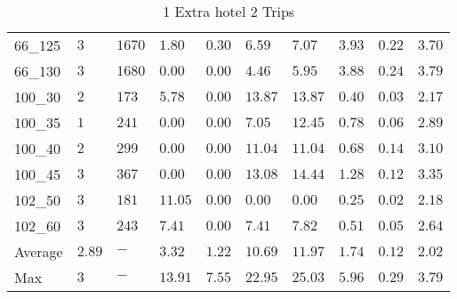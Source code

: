 \begin{center}
\begin{table}[]
\begin{adjustwidth}{-0.4in}{-1in}
\begin{tabular}{|lll|l|l|ll|lll|}
66\_125  & $3$    & $1670$ & $1.80 $  & $0.30$     & $6.59 $      & $7.07 $     & $3.93$   & $0.22$     & $3.70$      \\
66\_130  & $3$    & $1680$ & $\bm{0.00} $  & $\bm{0.00}$     & $4.46 $      & $5.95 $     & $3.88$   & $0.24$     & $3.79$      \\
\hline
100\_30  & $2$    & $173$  & $5.78$   & $\bm{0.00}$     & $13.87$      & $13.87$     & $0.40$   & $0.03$     & $2.17$      \\
100\_35  & $1$    & $241$  & $\bm{0.00}$   & $\bm{0.00}$     & $7.05 $      & $12.45$     & $0.78$   & $0.06$     & $2.89$      \\
100\_40  & $2$    & $299$  & $\bm{0.00}$   & $\bm{0.00}$     & $11.04$      & $11.04$     & $0.68$   & $0.14$     & $3.10$      \\
100\_45  & $3$    & $367$  & $\bm{0.00}$   & $\bm{0.00}$     & $13.08$      & $14.44$     & $1.28$   & $0.12$     & $3.35$      \\
\hline
102\_50  & $3$    & $181$  & $11.05$  & $\bm{0.00}$     & $\bm{0.00}$       & $\bm{0.00}$      & $0.25$   & $0.02$     & $2.18$      \\
102\_60  & $3$    & $243$  & $7.41 $  & $\bm{0.00}$     & $7.41$       & $7.82$      & $0.51$   & $0.05$     & $2.64$      \\
\hline
Average & $2.89$  & $-$    & $3.32 $  & $1.22$     & $10.69$      & $11.97$     & $1.74$   & $0.12$     & $2.02$      \\
Max     & $3   $  & $-$    & $13.91$  & $7.55$     & $22.95$      & $25.03$     & $5.96$   & $0.29$     & $3.79$      \\
\hline
    \end{tabular}
    \end{adjustwidth}
    \caption{1 Extra hotel 2 Trips}
    \label{1-2}
    \end{table}
\end{center}
